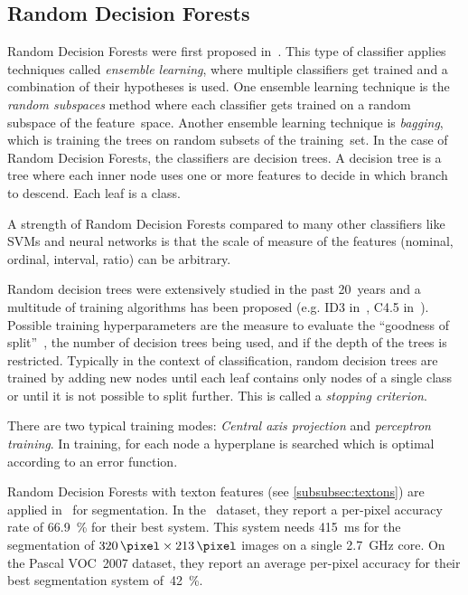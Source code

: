 
\subsection{Random Decision Forests}\label{subsec:random-forests}

Random Decision Forests were first proposed in~\cite{ho1995random}. This type
of classifier applies techniques called \textit{ensemble learning}, where
multiple classifiers get trained and a combination of their hypotheses is
used. One ensemble learning technique is the \textit{random subspaces} method
where each classifier gets trained on a random subspace of the feature~space.
Another ensemble learning technique is \textit{bagging}, which is training the
trees on random subsets of the training~set. In the case of Random Decision
Forests, the classifiers are decision trees. A decision tree is a tree where
each inner node uses one or more features to decide in which branch to descend.
Each leaf is a class.

A strength of Random Decision Forests compared to many other classifiers like
\glspl{SVM} and neural networks is that the scale of measure of the features
(nominal, ordinal, interval, ratio) can be arbitrary.

Random decision trees were extensively studied in the past 20~years and a
multitude of training algorithms has been proposed (e.g. ID3
in~\cite{quinlan1986induction}, C4.5 in~\cite{quinlan2014c4}). Possible
training hyperparameters are the measure to evaluate the \enquote{goodness of
split}~\cite{raey89empirical}, the number of decision trees being used, and if
the depth of the trees is restricted. Typically in the context of
classification, random decision trees are trained by adding new nodes until
each leaf contains only nodes of a single class or until it is not possible to
split further. This is called a \textit{stopping criterion}.

There are two typical training modes: \textit{Central axis projection} and
\textit{perceptron training}. In training, for each node a hyperplane is
searched which is optimal according to an error function.

Random Decision Forests with texton features (see \cref{subsubsec:textons}) are
applied in~\cite{shotton2008semantic} for segmentation. In the~\cite{MSCR-db}
dataset, they report a per-pixel accuracy rate of \SI{66.9}{\percent} for their
best system. This system needs \SI{415}{\milli\second} for the segmentation of
$\SI{320}{\pixel} \times \SI{213}{\pixel}$ images on a single
\SI{2.7}{\giga\hertz} core. On the Pascal VOC~2007 dataset, they report an
average per-pixel accuracy for their best segmentation system
of~\SI{42}{\percent}.
